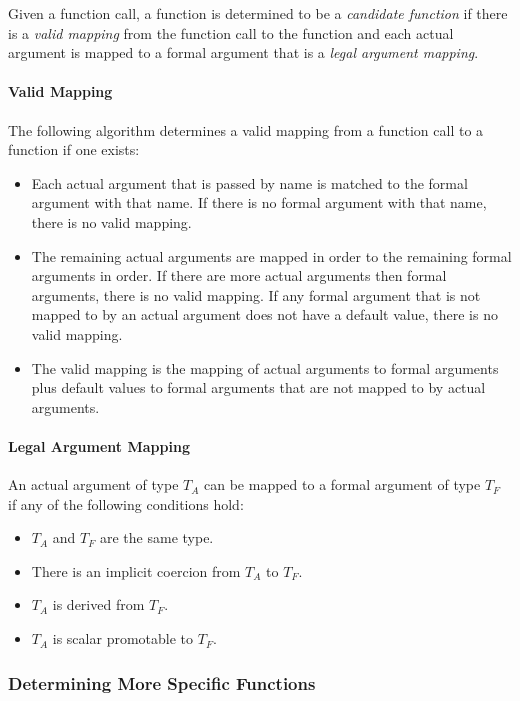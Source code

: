 Given a function call, a function is determined to be
a \emph{candidate function} if there is a \emph{valid mapping} from
the function call to the function and each actual argument is mapped
to a formal argument that is a \emph{legal argument mapping}.

\paragraph{Valid Mapping}

The following algorithm determines a valid mapping from a function
call to a function if one exists:
\begin{itemize}
\item
Each actual argument that is passed by name is matched to the formal
argument with that name.  If there is no formal argument with that
name, there is no valid mapping.
\item
The remaining actual arguments are mapped in order to the remaining
formal arguments in order.  If there are more actual arguments then
formal arguments, there is no valid mapping.  If any formal argument
that is not mapped to by an actual argument does not have a default
value, there is no valid mapping.
\item
The valid mapping is the mapping of actual arguments to formal
arguments plus default values to formal arguments that are not mapped
to by actual arguments.
\end{itemize}

\paragraph{Legal Argument Mapping}

An actual argument of type $T_A$ can be mapped to a formal argument of
type $T_F$ if any of the following conditions hold:
\begin{itemize}
\item $T_A$ and $T_F$ are the same type.
\item There is an implicit coercion from $T_A$ to $T_F$.
\item $T_A$ is derived from $T_F$.
\item $T_A$ is scalar promotable to $T_F$.
\end{itemize}

\subsubsection{Determining More Specific Functions}
\label{Determining_More_Specific_Functions}

